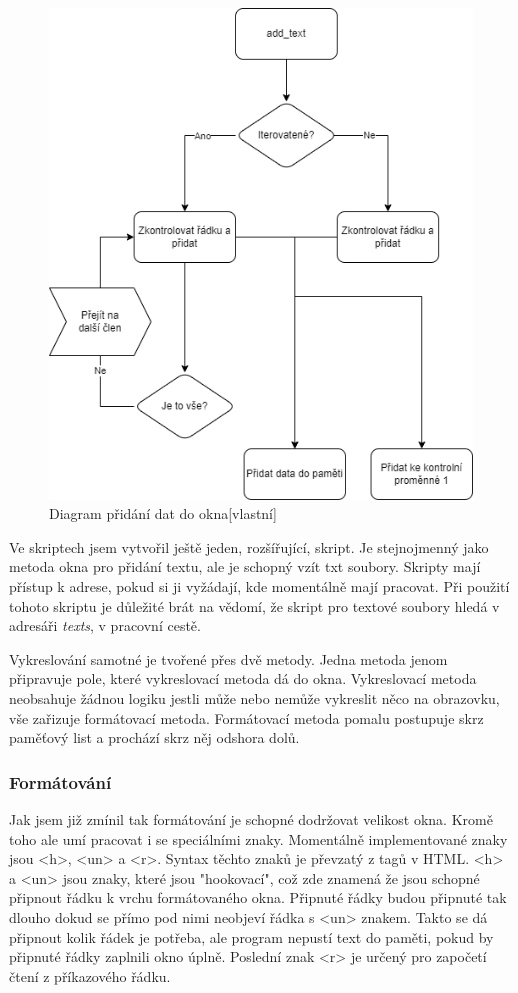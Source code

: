 \documentclass[12pt,a4paper]{article}
\begin{document}
\begin{figure}[H]
    \centering
    \includegraphics[width=\textwidth-3 cm]{pictures/logic-window.drawio.png}
    \caption{Diagram přidání dat do okna[vlastní]}
\end{figure}

Ve skriptech jsem vytvořil ještě jeden, rozšířující, skript. Je stejnojmenný jako metoda okna pro přidání textu, ale je schopný vzít txt soubory. Skripty mají přístup k adrese, pokud si ji vyžádají, kde momentálně mají pracovat. Při použití tohoto skriptu je důležité brát na vědomí, že skript pro textové soubory hledá v adresáři \textit{texts}, v pracovní cestě.

Vykreslování samotné je tvořené přes dvě metody. Jedna metoda jenom připravuje pole, které vykreslovací metoda dá do okna. Vykreslovací metoda neobsahuje žádnou logiku jestli může nebo nemůže vykreslit něco na obrazovku, vše zařizuje formátovací metoda.
Formátovací metoda pomalu postupuje skrz paměťový list a prochází skrz něj odshora dolů.
\subsubsection{Formátování}
Jak jsem již zmínil tak formátování je schopné dodržovat velikost okna. Kromě toho ale umí pracovat i se speciálními znaky. Momentálně implementované znaky jsou <h>, <un> a <r>. Syntax těchto znaků je převzatý z tagů v HTML. <h> a <un> jsou znaky, které jsou "hookovací", což zde znamená že jsou schopné připnout řádku k vrchu formátovaného okna. Připnuté řádky budou připnuté tak dlouho dokud se přímo pod nimi neobjeví řádka s <un> znakem. Takto se dá připnout kolik řádek je potřeba, ale program nepustí text do paměti, pokud by připnuté řádky zaplnili okno úplně. Poslední znak <r> je určený pro započetí čtení z příkazového řádku.
\end{document}
